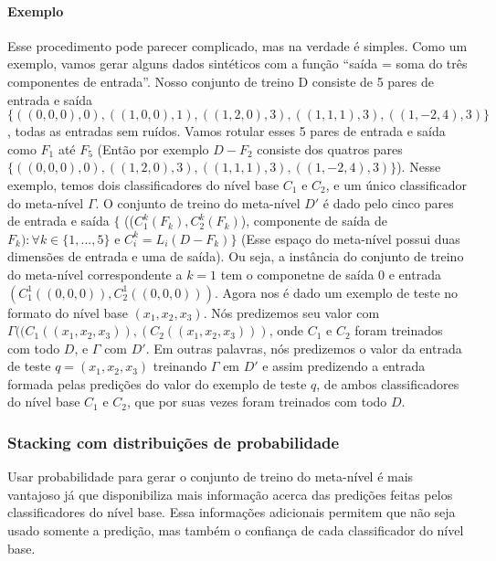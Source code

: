 \documentclass[]{book}
\begin{document}
\paragraph{Exemplo}\label{exemplo}

Esse procedimento pode parecer complicado, mas na verdade é simples.
Como um exemplo, vamos gerar alguns dados sintéticos com a função
``saída = soma do três componentes de entrada''. Nosso conjunto de
treino D consiste de 5 pares de entrada e saída
\(\{((0,0,0),0), ((1,0,0),1), ((1,2,0),3), ((1,1,1),3), ((1,-2,4),3)\}\),
todas as entradas sem ruídos. Vamos rotular esses 5 pares de entrada e
saída como \(F_1\) até \(F_5\) (Então por exemplo \(D - F_2\) consiste
dos quatros pares
\(\{((0,0,0),0), ((1,2,0),3), ((1,1,1),3), ((1,-2,4),3)\}\)). Nesse
exemplo, temos dois classificadores do nível base \(C_1\) e \(C_2\), e
um único classificador do meta-nível \(\Gamma\). O conjunto de treino do
meta-nível \(D'\) é dado pelo cinco pares de entrada e saída \(\{\)
((\(C_1^k(F_k), C_2^k(F_k)\)), componente de saída de
\(F_k) : \forall k \in \{1,...,5\}\) e \(C_i^k = L_i(D-F_k)\}\) (Esse
espaço do meta-nível possui duas dimensões de entrada e uma de saída).
Ou seja, a instância do conjunto de treino do meta-nível correspondente
a \(k = 1\) tem o componetne de saída 0 e entrada
\((C_1^1((0,0,0)), C_2^1((0,0,0)))\). Agora nos é dado um exemplo de
teste no formato do nível base \((x_1, x_2, x_3)\). Nós predizemos seu
valor com \(\Gamma((C_1((x_1, x_2, x_3)), (C_2((x_1, x_2, x_3)))\), onde
\(C_1\) e \(C_2\) foram treinados com todo \(D\), e \(\Gamma\) com
\(D'\). Em outras palavras, nós predizemos o valor da entrada de teste
\(q = (x_1, x_2, x_3)\) treinando \(\Gamma\) em \(D'\) e assim
predizendo a entrada formada pelas predições do valor do exemplo de
teste \(q\), de ambos classificadores do nível base \(C_1\) e \(C_2\),
que por suas vezes foram treinados com todo \(D\).

\subsubsection{Stacking com distribuições de
probabilidade}\label{stacking-com-distribuicoes-de-probabilidade}

Usar probabilidade para gerar o conjunto de treino do meta-nível é mais
vantajoso já que disponibiliza mais informação acerca das predições
feitas pelos classificadores do nível base. Essa informações adicionais
permitem que não seja usado somente a predição, mas também o confiança
de cada classificador do nível base.
\end{document}
